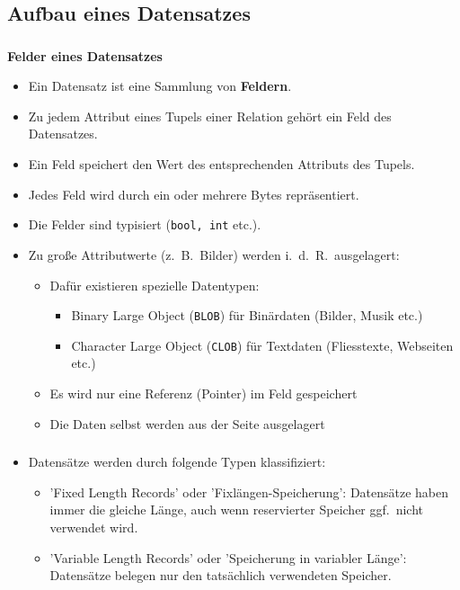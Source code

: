 \subsection{Aufbau eines Datensatzes}

\begin{frame}
\frametitle{\insertsection}
\framesubtitle{\insertsubsection}
\textbf{Felder eines Datensatzes}
\begin{itemize} 
	\item Ein Datensatz ist eine Sammlung von \textbf{Feldern}.
  \item Zu jedem Attribut eines Tupels einer Relation geh\"ort ein Feld des Datensatzes.
	\item Ein Feld speichert den Wert des entsprechenden Attributs des Tupels.\\[20pt]
	\item Jedes Feld wird durch ein oder mehrere Bytes repräsentiert.
	\item Die Felder sind typisiert (\texttt{bool, int} etc.).
	\pause
	\item Zu gro\ss e Attributwerte (z.~B.~Bilder) werden i.~d.~R.~ausgelagert:
	\begin{itemize}
		\item Daf\"ur existieren spezielle Datentypen:
		\begin{itemize}
			\item Binary Large Object (\texttt{BLOB}) für Binärdaten (Bilder, Musik etc.)
			\item Character Large Object (\texttt{CLOB}) für Textdaten (Fliesstexte, Webseiten etc.)
		\end{itemize}  
		\item Es wird nur eine Referenz (Pointer) im Feld gespeichert
		\item Die Daten selbst werden aus der Seite ausgelagert
	\end{itemize}	
\end{itemize}
\end{frame}

\begin{frame}
	\frametitle{\insertsection}
	\framesubtitle{\insertsubsection}
 \begin{itemize}
	\item Datens\"atze werden durch folgende Typen klassifiziert:
	\begin{itemize}
		\item 'Fixed Length Records' oder 'Fixl\"angen-Speicherung': Datens\"atze haben immer die gleiche L\"ange, auch wenn reservierter 
		Speicher ggf.~nicht verwendet wird.
		\item 'Variable Length Records' oder 'Speicherung in variabler L\"ange': Datens\"atze belegen nur den tats\"achlich verwendeten 
		Speicher.
	\end{itemize}
\end{itemize}    
\end{frame}

